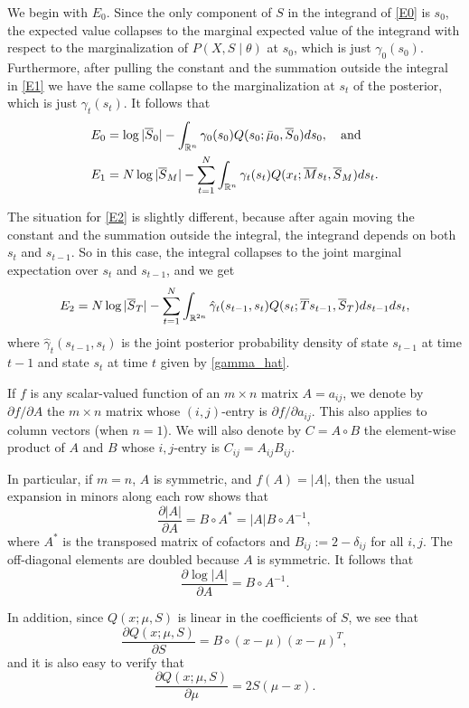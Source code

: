 \documentclass[12pt,leqno]{article}
\begin{document}
We begin with $E_0$. Since the only component of $S$ in the integrand of \eqref{E0} is $s_0$, the expected value
collapses to the marginal 
expected value of the integrand with respect to the marginalization of $P(X,S\mid\theta)$ at $s_0$, which is just 
$\gamma_0(s_0)$.  Furthermore, after pulling the constant and the summation 
outside the integral in \eqref{E1} we have the same collapse to the marginalization at $s_t$ of the posterior, which
is just $\gamma_t(s_t)$.  It follows that
\begin{align*}
E_0 &= \log|\overline{S}_0| - \int_{{\mathbb R}^n}\gamma_0(s_0)Q(s_0;\bar{\mu}_0,\overline{S}_0)ds_0,\quad\text{and}\\
E_1 &= N\log|\overline{S}_M| - \sum_{t=1}^N\int_{{\mathbb R}^n}\gamma_t(s_t)Q(x_t;\overline{M}s_t,\overline{S}_M)ds_t.
\end{align*}

The situation for \eqref{E2} is slightly different, because after again moving the constant and the summation outside
the integral, the integrand depends on both $s_t$ and $s_{t-1}$.  So in this case, the integral collapses to the 
joint marginal expectation over $s_t$ and $s_{t-1}$, and we get
$$
E_2 = N\log|\overline{S}_T| - \sum_{t=1}^N\int_{{\mathbb R}^{2n}}\hat{\gamma}_t(s_{t-1},s_t)Q(s_t;\overline{T}s_{t-1},\overline{S}_T)ds_{t-1}ds_t,
$$
where $\hat{\gamma}_t(s_{t-1},s_t)$ is the joint posterior probability density of state $s_{t-1}$ at time $t-1$ and state $s_t$ 
at time $t$ given by \eqref{gamma_hat}.

If $f$ is any scalar-valued function of an $m\times{n}$ matrix $A = a_{ij}$, we denote by $\partial{f}/\partial{A}$ the 
$m\times{n}$ matrix whose $(i,j)$-entry is $\partial{f}/\partial{a_{ij}}$.  This also applies to column vectors
(when $n=1$). We will also denote by $C = A\circ{B}$ the element-wise product of $A$ and $B$ whose $i,j$-entry is
$C_{ij} = A_{ij}B_{ij}$.

In particular, if $m=n$, $A$ is symmetric, and $f(A) = |A|$,  then the usual expansion 
in minors along each row shows that 
$$
\frac{\partial{|A|}}{\partial{A}} = B\circ{A}^* = |A|B\circ{A}^{-1},
$$
where $A^*$ is the transposed matrix of cofactors and $B_{ij} := 2-\delta_{ij}$ for all $i,j$.
The off-diagonal elements are doubled because $A$ is symmetric.
It follows that
$$
\frac{\partial{\log|A|}}{\partial{A}} = B\circ{A}^{-1}. 
$$

In addition, since $Q(x;\mu,S)$ is linear in the coefficients of $S$, we see that
$$
\frac{\partial{Q(x;\mu,S)}}{\partial{S}} = B\circ(x-\mu)(x-\mu)^T,
$$
and it is also easy to verify that
$$
\frac{\partial{Q(x;\mu,S)}}{\partial{\mu}} = 2S(\mu-x).
$$
\end{document}
